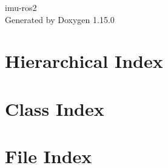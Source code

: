 \documentclass[twoside]{book}
\newcommand{\+}{\discretionary{\mbox{\scriptsize$\hookleftarrow$}}{}{}}
\newcommand{\clearemptydoublepage}{%
    \newpage{\pagestyle{empty}\cleardoublepage}%
  }
\begin{document}
  \raggedbottom
    \hypersetup{pageanchor=false,
                bookmarksnumbered=true,
                pdfencoding=unicode
               }
  \begin{titlepage}
  \vspace*{7cm}
  \begin{center}%
  {\Large imu-\/ros2}\\
  \vspace*{1cm}
  {\large Generated by Doxygen 1.15.0}\\
  \end{center}
  \end{titlepage}
  \clearemptydoublepage
  \tableofcontents
  \clearemptydoublepage
  \hypersetup{pageanchor=true}
\chapter{Hierarchical Index}

\chapter{Class Index}

\chapter{File Index}

\end{document}
